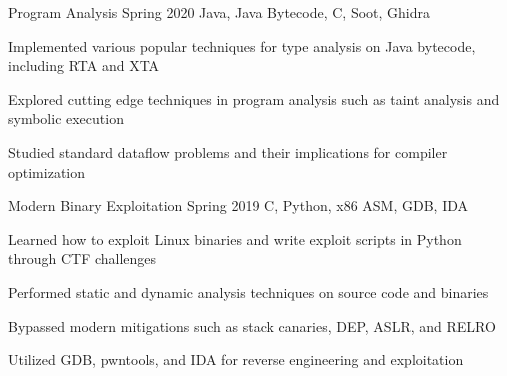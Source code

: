 \begin{cventries}
  \cvcourse
    {Program Analysis}
    {Spring 2020}
    {Java, Java Bytecode, C, Soot, Ghidra}
    {
      \begin{cvitems}
        \item {Implemented various popular techniques for type analysis on Java bytecode, including RTA and XTA}
        \item {Explored cutting edge techniques in program analysis such as taint analysis and symbolic execution}
        \item {Studied standard dataflow problems and their implications for compiler optimization}
      \end{cvitems}
    }
    
  \cvcourse
    {Modern Binary Exploitation}
    {Spring 2019}
    {C, Python, x86 ASM, GDB, IDA}
    {
      \begin{cvitems}
        \item {Learned how to exploit Linux binaries and write exploit scripts in Python through CTF challenges}
        \item {Performed static and dynamic analysis techniques on source code and binaries}
        \item {Bypassed modern mitigations such as stack canaries, DEP, ASLR, and RELRO}
        \item {Utilized GDB, pwntools, and IDA for reverse engineering and exploitation}
      \end{cvitems}
    }
\end{cventries}